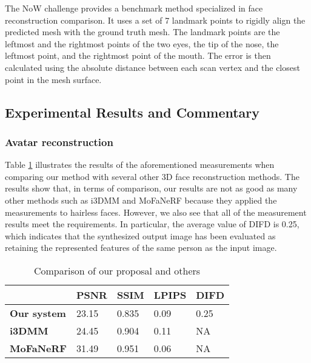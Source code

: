 The NoW challenge provides a benchmark method specialized in face reconstruction comparison. It uses a set of 7 landmark points to rigidly align the predicted mesh with the ground truth mesh. The landmark points are the leftmost and the rightmost points of the two eyes, the tip of the nose, the leftmost point, and the rightmost point of the mouth. The error is then calculated using the absolute distance between each scan vertex and the closest point in the mesh surface.


\subsection{Experimental Results and Commentary}
\subsubsection{Avatar reconstruction}

Table \ref{loss_stats} illustrates the results of the aforementioned measurements when comparing our method with several other 3D face reconstruction methods. The results show that, in terms of comparison, our results are not as good as many other methods such as i3DMM and MoFaNeRF because they applied the measurements to hairless faces. However, we also see that all of the measurement results meet the requirements. In particular, the average value of DIFD is 0.25, which indicates that the synthesized output image has been evaluated as retaining the represented features of the same person as the input image.

\begin{table}[H]
    \centering
    \captionsetup{font=bf}
    \caption{Comparison of our proposal and others}
    \begin{tabularx}{\linewidth}{| X | X | X | X | X |}
        \hline
                            & \textbf{PSNR} & \textbf{SSIM} & \textbf{LPIPS} & \textbf{DIFD} \\ \hline\hline
        \textbf{Our system} & 23.15         & 0.835         & 0.09           & 0.25          \\ \hline %
        \textbf{i3DMM}      & 24.45         & 0.904         & 0.11           & NA            \\ \hline
        \textbf{MoFaNeRF}   & 31.49         & 0.951         & 0.06           & NA            \\ \hline
    \end{tabularx}
    \label{loss_stats}
\end{table}

